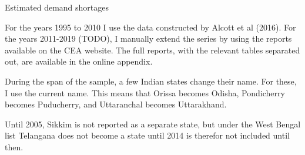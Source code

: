 Estimated demand shortages

For the years 1995 to 2010 I use the data constructed by Alcott et al (2016). For the years 2011-2019 (TODO), I manually extend the series by using the reports available on the CEA website. The full reports, with the relevant tables separated out, are available in the online appendix. 

During the span of the sample, a few Indian states change their name. For these, I use the current name. This means that Orissa becomes Odisha, Pondicherry becomes Puducherry, and Uttaranchal becomes Uttarakhand.

Until 2005, Sikkim is not reported as a separate state, but under the West Bengal list
Telangana does not become a state until 2014 is therefor not included until then.





